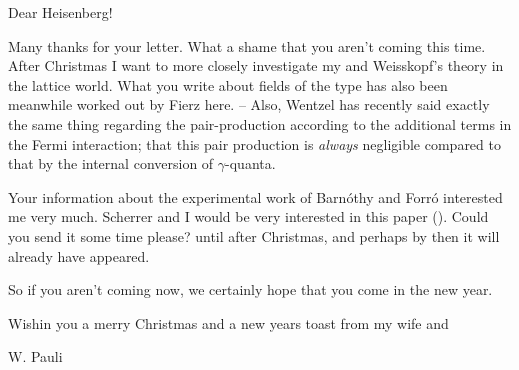 \date{December 21, 1936}
\tags{}


Dear Heisenberg!

Many thanks for your letter. What a shame that you aren't coming this time. After Christmas I want to more closely investigate my and Weisskopf's theory in the lattice world. What you write about fields of the type
has also been meanwhile worked out by Fierz here. -- Also, Wentzel has recently said exactly the same thing regarding the pair-production according to the additional terms in the Fermi interaction; that this pair production is \textit{always} negligible compared to that by the internal conversion of $\gamma$-quanta.

Your information about the experimental work of Barn\'othy and Forr\'o interested me very much. Scherrer and I would be very interested in this paper (). Could you send it some time please?  until after Christmas, and perhaps by then it will already have appeared.

So if you aren't coming now, we certainly hope that you come in the new year.

Wishin you a merry Christmas and a new years toast from my wife and

W. Pauli

